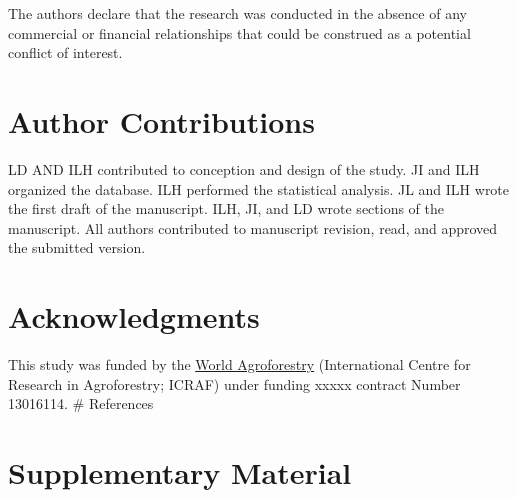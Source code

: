\documentclass[utf8]{frontiersSCNS}
\begin{document}
The authors declare that the research was conducted in the absence of
any commercial or financial relationships that could be construed as a
potential conflict of interest.

\hypertarget{author-contributions}{%
\section*{Author Contributions}\label{author-contributions}}

LD AND ILH contributed to conception and design of the study. JI and ILH
organized the database. ILH performed the statistical analysis. JL and
ILH wrote the first draft of the manuscript. ILH, JI, and LD wrote
sections of the manuscript. All authors contributed to manuscript
revision, read, and approved the submitted version.

\hypertarget{acknowledgments}{%
\section*{Acknowledgments}\label{acknowledgments}}

This study was funded by the
\href{http://www.worldagroforestry.org/}{World Agroforestry}
(International Centre for Research in Agroforestry; ICRAF) under funding
xxxxx contract Number 13016114. \# References

\hypertarget{supplementary-material}{%
\section{Supplementary Material}\label{supplementary-material}}
\end{document}
